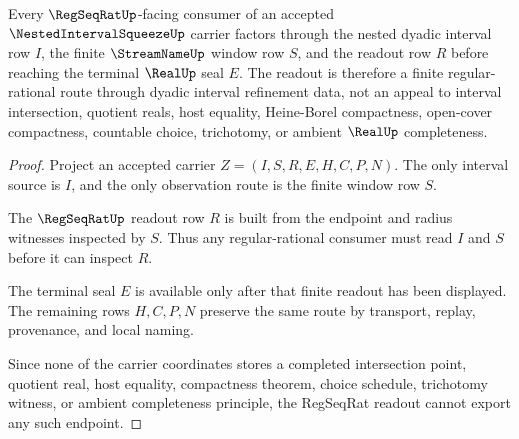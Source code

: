 \begin{theorem}
\label{thm:nested-interval-squeeze-regseqrat-readout}
Every $\RegSeqRatUp$-facing consumer of an accepted $\NestedIntervalSqueezeUp$ carrier factors through the nested dyadic interval row $I$, the finite $\StreamNameUp$ window row $S$, and the readout row $R$ before reaching the terminal $\RealUp$ seal $E$. The readout is therefore a finite regular-rational route through dyadic interval refinement data, not an appeal to interval intersection, quotient reals, host equality, Heine-Borel compactness, open-cover compactness, countable choice, trichotomy, or ambient $\RealUp$ completeness.
\end{theorem}
\begin{proof}
Project an accepted carrier $Z=(I,S,R,E,H,C,P,N)$. The only interval source is $I$, and the only observation route is the finite window row $S$.

The $\RegSeqRatUp$ readout row $R$ is built from the endpoint and radius witnesses inspected by $S$. Thus any regular-rational consumer must read $I$ and $S$ before it can inspect $R$.

The terminal seal $E$ is available only after that finite readout has been displayed. The remaining rows $H,C,P,N$ preserve the same route by transport, replay, provenance, and local naming.

Since none of the carrier coordinates stores a completed intersection point, quotient real, host equality, compactness theorem, choice schedule, trichotomy witness, or ambient completeness principle, the RegSeqRat readout cannot export any such endpoint.
\end{proof}


\begin{closurestatus}{\NestedIntervalSqueezeUp}
  \theoryclosure{\seedClosure}
  \formalstatus{\unformalizedV}
\end{closurestatus}
